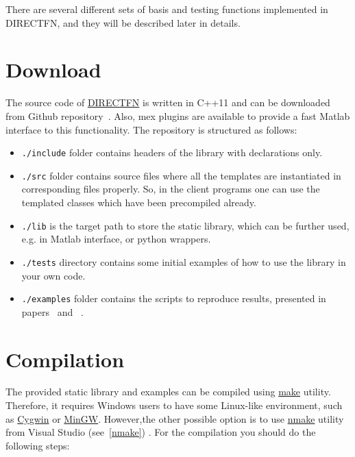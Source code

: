 \documentclass[a4wide,11pt]{article}
\renewcommand{\[}{\begin{equation}}
\renewcommand{\]}{\end{equation}}
\renewcommand{\{}{\begin{eqnarray}}
\renewcommand{\}}{\end{eqnarray}}
\begin{document}
There are several different sets of basis and testing functions implemented in DIRECTFN, and they will be described later in details. 
\section{Download}
The source code of \href{https://github.com/thanospol/DIRECTFN}{DIRECTFN} is written in C++11 and can be downloaded from Github repository~\cite{DIRECTFN}. Also, mex plugins are available to provide a fast Matlab interface to this functionality. The repository is structured as follows:
\begin{itemize}
	\item
\texttt{./include}
folder contains headers of the library with declarations only.
\item \texttt{./src} folder contains source
files where all the templates are instantiated in corresponding files properly. So, in the client programs
one can use the templated classes which have been precompiled already. 
 \item \texttt{./lib} is the target path to store the static library, which can be further used, e.g. in Matlab interface, or python wrappers.
\item \texttt{./tests} directory contains some
initial examples of how to use the library in your own code. 
\item \texttt{./examples} folder contains the scripts to reproduce results, presented in papers~\cite{Tambova_EuCap2017} and ~\cite{Tambova2017}.
\end{itemize}
\section{Compilation}

The provided static library and examples can be compiled using \href{https://www.gnu.org/software/make/}{make} utility. Therefore, it requires Windows users to have some Linux-like environment, such as \href{https://www.cygwin.com/}{Cygwin} or \href{http://www.mingw.org/}{MinGW}. However,the other possible option is to use \href{https://msdn.microsoft.com/en-us/library/dd9y37ha.aspx}{nmake} utility from Visual Studio (see~\ref{nmake}) . For the compilation you should do the following steps:
\end{document}
